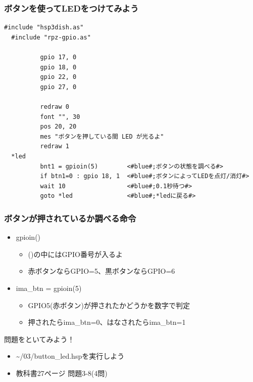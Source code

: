 \begin{frame}[fragile]
  \frametitle{ボタンを使ってLEDをつけてみよう}
  \begin{lstlisting}[title=\sim/03/button\_led.hsp, label=button_led.hsp]
  #include "hsp3dish.as"
  #include "rpz-gpio.as"
  
          gpio 17, 0
          gpio 18, 0
          gpio 22, 0
          gpio 27, 0

          redraw 0
          font "", 30
          pos 20, 20
          mes "ボタンを押している間 LED が光るよ"
          redraw 1
  *led
          bnt1 = gpioin(5)        <#blue#;ボタンの状態を調べる#>
          if btn1=0 : gpio 18, 1  <#blue#;ボタンによってLEDを点灯/消灯#>
          wait 10                 <#blue#;0.1秒待つ#>
          goto *led               <#blue#;*ledに戻る#>
  \end{lstlisting}
\end{frame}

\begin{frame}
  \frametitle{ボタンが押されているか調べる命令}
  \begin{itemize}
    \item gpioin()
          \begin{itemize}
            \item ()の中にはGPIO番号が入るよ
            \item 赤ボタンならGPIO=5、黒ボタンならGPIO=6
          \end{itemize}
    \item ima\_btn = gpioin(5)
          \begin{itemize}
            \item GPIO5(赤ボタン)が押されたかどうかを数字で判定
            \item 押されたらima\_btn=0、はなされたらima\_btn=1
          \end{itemize}
  \end{itemize}
\end{frame}

\begin{frame}
  \begin{exampleblock}{問題をといてみよう！}
    \begin{itemize}
      \item \sim/03/button\_led.hspを実行しよう
      \item 教科書27ページ 問題3-8(4問)
    \end{itemize}
  \end{exampleblock} 
\end{frame}

